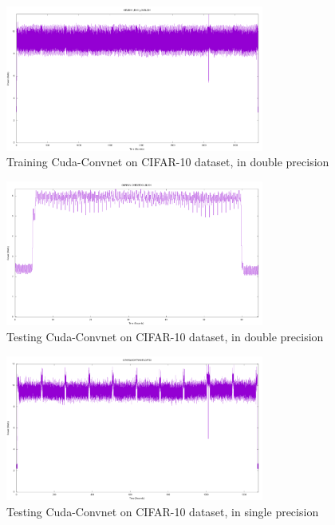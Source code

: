 \documentclass[letterpaper, 10 pt, conference]{ieeeconf}
\begin{document}
          \begin{figure}[h]
              \centering
              \includegraphics[width=85mm,scale=1]{cifar10_train_double.png}
              \caption{Training Cuda-Convnet on CIFAR-10 dataset, in double precision}
              \label{cifar10_train_double}
          \end{figure}

          \begin{figure}[h]
              \centering
              \includegraphics[width=85mm,scale=1]{cifar10_test_double.png}
              \caption{Testing Cuda-Convnet on CIFAR-10 dataset, in double precision}
              \label{cifar10_test_double}
          \end{figure}

          \begin{figure}[h]
              \centering
              \includegraphics[width=85mm,scale=1]{cifar10_train_single.png}
              \caption{Testing Cuda-Convnet on CIFAR-10 dataset, in single precision}
              \label{cifar10_train_single}
          \end{figure}
          
\end{document}
